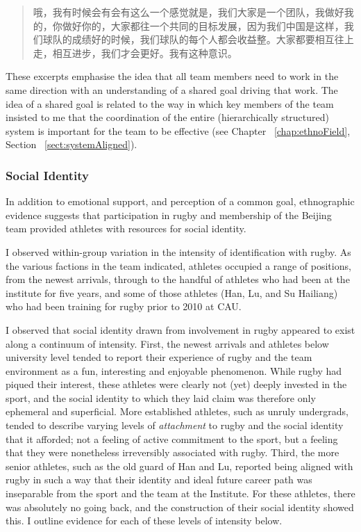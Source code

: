 \begin{CJK}{UTF8}{gbsn}
  \begin{quote}
      	哦，我有时候会有会有这么一个感觉就是，我们大家是一个团队，我做好我的，你做好你的，大家都往一个共同的目标发展，因为我们中国是这样，我们球队的成绩好的时候，我们球队的每个人都会收益整。大家都要相互往上走，相互进步，我们才会更好。我有这种意识。 
  \end{quote}

These excerpts emphasise the idea that all team members need to work in the same direction with an understanding of a shared goal driving that work.  The idea of a shared goal is related to the way in which key members of the team insisted to me that the coordination of the entire (hierarchically structured) system is important for the team to be effective (see Chapter ~\ref{chap:ethnoField}, Section ~\ref{sect:systemAligned}).




\subsubsection{Social Identity\label{sect:socialIdentity}}

In addition to emotional support, and perception of a common goal, ethnographic evidence suggests that participation in rugby and membership of the Beijing team provided athletes with resources for social identity.

I observed within-group variation in the intensity of identification with rugby.  As the various factions in the team indicated, athletes occupied a range of positions, from the newest arrivals, through to the handful of athletes who had been at the institute for five years, and some of those athletes (Han, Lu, and Su Hailiang) who had been training for rugby prior to 2010 at CAU.

I observed that social identity drawn from involvement in rugby appeared to exist along a continuum of intensity. First, the newest arrivals and athletes below university level tended to report their experience of rugby and the team environment as a fun, interesting and enjoyable phenomenon.  While rugby had piqued their interest, these athletes were clearly not (yet) deeply invested in the sport, and the social identity to which they laid claim was therefore only ephemeral and superficial.  More established athletes, such as unruly undergrads, tended to describe varying levels of \textit{attachment} to rugby and the social identity that it afforded; not a feeling of active commitment to the sport, but a feeling that they were nonetheless irreversibly associated with rugby.  Third, the more senior athletes, such as the old guard of Han and Lu, reported being aligned with rugby in such a way that their identity and ideal future career path was inseparable from the sport and the team at the Institute.  For these athletes, there was absolutely no going back, and the construction of their social identity showed this.  I outline evidence for each of these levels of intensity below.




\end{CJK}
